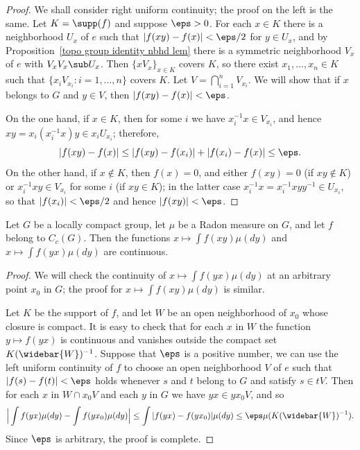 \begin{proof}
We shall consider right uniform continuity; the proof on the left is the
same. Let $K=\supp(f)$ and suppose $\eps>0$. For each $x\in K$ there is a neighborhood $U_x$ of $e$ such that $|f(xy)-f(x)|<\eps/2$ for $y\in U_x$, and by Proposition~\ref{topo group identity nbhd lem} there is a symmetric neighborhood $V_x$ of $e$ with $V_xV_x\sub U_x$. Then $\{xV_x\}_{x\in K}$ covers $K$, so there exist $x_1,\dots,x_n\in K$ such that $\{x_iV_{x_i}:i=1,\dots,n\}$ covers $K$. Let $V=\bigcap_{i=1}^{n}V_{x_i}$. We will show that
if $x$ belongs to $G$ and $y\in V$, then $|f(xy)-f(x)|<\eps$.\par
On the one hand, if $x\in K$, then for some $i$ we have $x_i^{-1}x\in V_{x_i}$, and hence $xy=x_i(x_i^{-1}x)y\in x_iU_{x_i}$; therefore,
\[|f(xy)-f(x)|\leq|f(xy)-f(x_i)|+|f(x_i)-f(x)|\leq\eps.\]
On the other hand, if $x\notin K$, then $f(x)=0$, and either $f(xy)=0$ (if $xy\notin K$) or $x_i^{-1}xy\in V_{x_i}$ for some $i$ (if $xy\in K$); in the latter case $x_i^{-1}x=x_i^{-1}xyy^{-1}\in U_{x_i}$, so that $|f(x_i)|<\eps/2$ and hence $|f(xy)|<\eps$.
\end{proof}
\begin{corollary}\label{LCH group int with parameter is continuous}
Let $G$ be a locally compact group, let $\mu$ be a Radon measure on $G$, and let $f$ belong to $C_c(G)$. Then the functions $x\mapsto\int f(xy)\mu(dy)$ and $x\mapsto\int f(yx)\mu(dy)$ are continuous.
\end{corollary}
\begin{proof}
We will check the continuity of $x\mapsto\int f(yx)\mu(dy)$ at an arbitrary point $x_0$ in $G$; the proof for $x\mapsto\int f(xy)\mu(dy)$ is similar.\par
Let $K$ be the support of $f$, and let $W$ be an open neighborhood of $x_0$ whose closure is compact. It is easy to check that for each $x$ in $W$ the function $y\mapsto f(yx)$ is continuous and vanishes outside the compact set $K(\widebar{W})^{-1}$. Suppose that $\eps$ is a positive number, we can use the left uniform continuity of $f$ to choose an open neighborhood $V$ of $e$ such that $|f(s)-f(t)|<\eps$ holds whenever $s$ and $t$ belong to $G$ and satisfy $s\in tV$. Then for each $x$ in $W\cap x_0V$ and each $y$ in $G$ we have $yx\in yx_0V$, and so
\begin{align*}
\Big|\int f(yx)\mu(dy)-\int f(yx_0)\mu(dy)\Big|\leq\int|f(yx)-f(yx_0)|\mu(dy)\leq\eps\mu(K(\widebar{W})^{-1}).
\end{align*}
Since $\eps$ is arbitrary, the proof is complete.
\end{proof}
